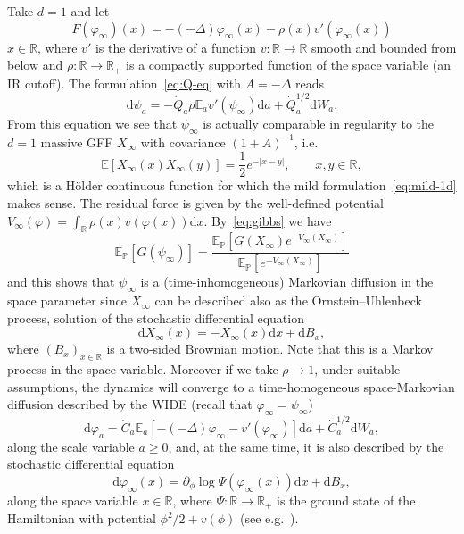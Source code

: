 \documentclass[reprint,aps]{revtex4-2}
\newcommand{\mathd}{\mathrm{d}}
\begin{document}
Take $d = 1$ and let
\[ F (\varphi_{\infty}) (x) = - (- \Delta) \varphi_{\infty} (x) - \rho (x) v'
   (\varphi_{\infty} (x)) \]
$x \in \mathbb{R}$, where $v'$ is the derivative of a function $v : \mathbb{R}
\rightarrow \mathbb{R}$ smooth and bounded from below and $\rho : \mathbb{R}
\rightarrow \mathbb{R}_+$ is a compactly supported function of the space
variable (an IR cutoff). The formulation~\eqref{eq:Q-eq} with $A = - \Delta$
reads
\begin{equation}
  \mathd \psi_a = - \dot{Q}_a \rho \mathbb{E}_a v' (\psi_{\infty}) \mathd a +
  \dot{Q}_a^{1 / 2} \mathd W_a . \label{eq:mild-1d}
\end{equation}
From this equation we see that $\psi_{\infty}$ is actually comparable in
regularity to the $d = 1$ massive GFF $X_{\infty}$ with covariance $(1 + A)^{-
1}$, i.e.
\[ \mathbb{E} [X_{\infty} (x) X_{\infty} (y)] = \frac{1}{2} e^{- | x - y |},
   \qquad x, y \in \mathbb{R}, \]
which is a H{\"o}lder continuous function for which the mild
formulation~\eqref{eq:mild-1d} makes sense. The residual force is given by the
well-defined potential $V_{\infty} (\varphi) = \int_{\mathbb{R}} \rho (x) v
(\varphi (x)) \mathd x$. By~\eqref{eq:gibbs} we have
\begin{equation}
  \mathbb{E}_{\mathbb{P}} [G (\psi_{\infty})] = \frac{\mathbb{E}_{\mathbb{P}}
  [G (X_{\infty}) e^{- V_{\infty} (X_{\infty})}]}{\mathbb{E}_{\mathbb{P}}
  [e^{- V_{\infty} (X_{\infty})}]} \label{eq:one-dim-path-integral}
\end{equation}
and this shows that $\psi_{\infty}$ is a (time-inhomogeneous) Markovian
diffusion in the space parameter since $X_{\infty}$ can be described also as
the Ornstein--Uhlenbeck process, solution of the stochastic differential
equation
\[ \mathd X_{\infty} (x) = - X_{\infty} (x) \mathd x + \mathd B_x, \]
where $(B_x)_{x \in \mathbb{R}}$ is a two-sided Brownian motion. Note that
this is a Markov process in the space variable. Moreover if we take $\rho
\rightarrow 1$, under suitable assumptions, the dynamics will converge to a
time-homogeneous space-Markovian diffusion described by the WIDE (recall that
$\varphi_{\infty} = \psi_{\infty}$)
\[ \mathd \varphi_a = \dot{C}_a \mathbb{E}_a [- (- \Delta) \varphi_{\infty} -
   v' (\varphi_{\infty})] \mathd a + \dot{C}_a^{1 / 2} \mathd W_a, \]
along the scale variable $a \geqslant 0$, and, at the same time, it is also
described by the stochastic differential equation
\[ \mathd \varphi_{\infty} (x) = \partial_{\phi} \log \Psi (\varphi_{\infty}
   (x)) \mathd x + \mathd B_x, \]
along the space variable $x \in \mathbb{R}$, where $\Psi : \mathbb{R}
\rightarrow \mathbb{R}_+$ is the ground state of the Hamiltonian with
potential $\phi^2 / 2 + v (\phi)$ (see
e.g.~{\cite{lorincziFeynmanKactypeTheoremsGibbs2011}}).
\end{document}
